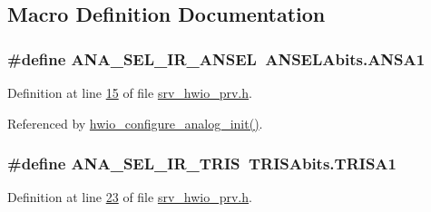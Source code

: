 \subsection{Macro Definition Documentation}
\hypertarget{a00034_af692a6826edc2455e2437b7c9860270b}{
\subsubsection[{A\+N\+A\+\_\+\+S\+E\+L\+\_\+\+I\+R\+\_\+\+A\+N\+S\+E\+L}]{\setlength{\rightskip}{0pt plus 5cm}\#define A\+N\+A\+\_\+\+S\+E\+L\+\_\+\+I\+R\+\_\+\+A\+N\+S\+E\+L~A\+N\+S\+E\+L\+Abits.\+A\+N\+S\+A1}}\label{a00034_af692a6826edc2455e2437b7c9860270b}


Definition at line \hyperlink{a00034_source_l00015}{15} of file \hyperlink{a00034_source}{srv\+\_\+hwio\+\_\+prv.\+h}.



Referenced by \hyperlink{a00056_source_l00099}{hwio\+\_\+configure\+\_\+analog\+\_\+init()}.

\hypertarget{a00034_a8733fa32cccaaec0f4571e64047a1f02}{
\subsubsection[{A\+N\+A\+\_\+\+S\+E\+L\+\_\+\+I\+R\+\_\+\+T\+R\+I\+S}]{\setlength{\rightskip}{0pt plus 5cm}\#define A\+N\+A\+\_\+\+S\+E\+L\+\_\+\+I\+R\+\_\+\+T\+R\+I\+S~T\+R\+I\+S\+Abits.\+T\+R\+I\+S\+A1}}\label{a00034_a8733fa32cccaaec0f4571e64047a1f02}


Definition at line \hyperlink{a00034_source_l00023}{23} of file \hyperlink{a00034_source}{srv\+\_\+hwio\+\_\+prv.\+h}.

